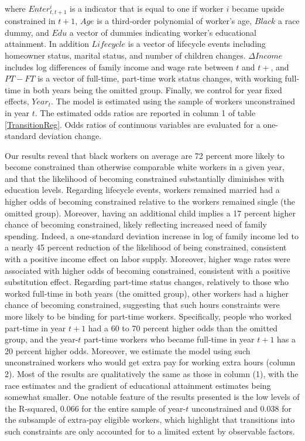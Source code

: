 \noindent where $Enter_{t, t+1}^i$ is a indicator that is equal to one if worker $i$ became upside constrained in $t+1$, $Age$ is a third-order polynomial of worker's age, $Black$ a race dummy, and $Edu$ a vector of dummies indicating worker's educational attainment.  In addition $Lifecycle$ is a vector of lifecycle events including homeowner status, marital status, and number of children changes.  $\Delta Income$ includes log differences of family income and wage rate between $t$ and $t+$, and $PT-FT$ is a vector of full-time, part-time work status changes, with working full-time in both years being the omitted group.  Finally, we control for year fixed effects, $Year_t$.  The model is estimated using the sample of workers unconstrained in year $t$.  The estimated odds ratios are reported in column 1 of table \ref{TransitionReg}.  Odds ratios of continuous variables are evaluated for a one-standard deviation change.

Our results reveal that black workers on average are 72 percent more likely to become constrained than otherwise comparable white workers in a given year, and that the likelihood of becoming constrained substantially diminishes with education levels.  Regarding lifecycle events, workers remained married had a higher odds of becoming constrained relative to the workers remained single (the omitted group).  Moreover, having an additional child implies a 17 percent higher chance of becoming constrained, likely reflecting increased need of family spending. Indeed, a one-standard deviation increase in log of family income led to a nearly 45 percent reduction of the likelihood of being constrained, consistent with a positive income effect on labor supply.  Moreover, higher wage rates were associated with higher odds of becoming constrained, consistent with a positive substitution effect. Regarding part-time status changes, relatively to those who worked full-time in both years (the omitted group), other workers had a higher chance of becoming constrained, suggesting that such hours constraints were more likely to be binding for part-time workers.  Specifically, people who worked part-time in year $t+1$ had a 60 to 70 percent higher odds than the omitted group, and the year-$t$ part-time workers who became full-time in year $t+1$ has a 20 percent higher odds.  Moreover, we estimate the model using such unconstrained workers who would get extra pay for working extra hours (column 2). Most of the results are qualitatively the same as those in column (1), with the race estimates and the gradient of educational attainment estimates being somewhat smaller. One notable feature of the results presented is the low levels of the R-squared, 0.066 for the entire sample of year-$t$ unconstrained and 0.038 for the subsample of extra-pay eligible workers, which highlight that transitions into such constraints are only accounted for to a limited extent by observable factors.

